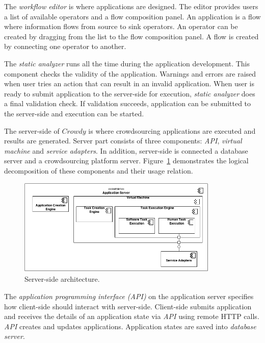 The \textit{workflow editor} is where applications are designed. The editor provides 
users a list of available operators and a flow composition panel. An application is 
a flow where information flows from source to sink operators. An operator can be 
created by dragging from the list to the flow composition panel. A flow is created by 
connecting one operator to another.

The \textit{static analyzer} runs all the time during the application development. This 
component checks the validity of the application. Warnings and errors are raised 
when user tries an action that can result in an invalid application. When user is 
ready to submit application to the server-side for execution, \textit{static analyzer} 
does a final validation check. If validation succeeds, application can be submitted 
to the server-side and execution can be started.

The server-side of $Crowdy$ is where crowdsourcing applications are executed and 
results are generated. Server part consists of three components: \textit{API}, 
\textit{virtual machine} and \textit{service adapters}. In addition, server-side 
is connected a database server and a crowdsourcing platform server. 
Figure~\ref{fig:serverdecomposition} demonstrates the logical decomposition of these 
components and their usage relation.

\begin{figure}[ht]
	\centering
	\includegraphics[width=0.85\textwidth]{figures/architecture/CC3.png}
	\caption{Server-side architecture.}
	\label{fig:serverdecomposition}
\end{figure}

The \textit{application programming interface (API)} on the application server 
specifies how client-side should interact with server-side. Client-side submits 
application and receives the details of an application state via \textit{API} using 
remote HTTP calls. \textit{API} creates and updates applications. Application 
states are saved into \textit{database server}.

